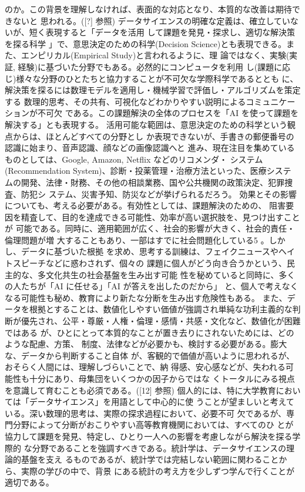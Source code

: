 \documentclass[
]{book}
\theoremstyle{definition}
\theoremstyle{definition}
\theoremstyle{definition}
\theoremstyle{definition}
\theoremstyle{remark}
\begin{document}
のか。この背景を理解しなければ、表面的な対応となり、本質的な改善は期待できないと 思われる。({[}?{]} 参照)
データサイエンスの明確な定義は、確立していないが、短く表現すると「データを活用 して課題を発見・探求し、適切な解決策を探る科学 」で、意思決定のための科学(Decision Science)とも表現できる。また、エンピリカル(Empirical Study)と言われるように、理 論ではなく、実験(実証, 経験)に基づいた分野でもある。必然的にコンピュータを利用 し(課題に応じ)様々な分野のひとたちと協力することが不可欠な学際科学であるととも に、解決策を探るには数理モデルを適用し・機械学習で評価し・アルゴリズムを策定する 数理的思考、その共有、可視化などわかりやすい説明によるコミュニケーションが不可欠 である。この課題解決の全体のプロセスを「AI を使って課題を解決する」とも表現する。 活用可能な範囲は、意思決定のための科学という観点からは、ほとんどすべての分野とし か表現できないが、手書きの郵便番号の認識に始まり、音声認識、顔などの画像認識へと 進み、現在注目を集めているものとしては、Google, Amazon, Netflix などのリコメンダ・ システム(Recommendation System)、診断・投薬管理・治療方法といった、医療システ ムの開発、法律・財務、その他の相談業務、国や公共機関の政策決定、犯罪捜査、防犯シ ステム、災害予知、防災などが挙げられるだろう。
効果とその影響についても、考える必要がある。有効性としては、課題解決のための、 阻害要因を精査して、目的を達成できる可能性、効率が高い選択肢を、見つけ出すことが 可能である。同時に、適用範囲が広く、社会的影響が大きく、社会的責任・倫理問題が増 大することもあり、一部はすでに社会問題化している5 。しかし、データに基づいた根拠 を求め、思考する訓練は、フェイクニュースやヘイトスピーチなどに惑わされず、個々の 課題に個人がどう向き合うかという、民主的な、多文化共生の社会基盤を生み出す可能 性を秘めていると同時に、多くの人たちが「AI に任せる」「AI が答えを出したのだから」 と、個人で考えなくなる可能性も秘め、教育により新たな分断を生み出す危険性もある。 また、データを根拠とすることは、数値化しやすい価値が強調され単純な功利主義的な判 断が優先され、公平・尊厳・人権・倫理・感情・共感・文化など、数値化が困難ではある が、ひとにとって本質的なことが置き去りにされないためには、どのような配慮、方策、 制度、法律などが必要かも、検討する必要がある。膨大な、データから判断すること自体 が、客観的で価値が高いように思われるが、おそらく人間には、理解しづらいことで、納 得感、安心感などが、失われる可能性も十分にあり、母集団をいくつかの因子からではな くトータルにみる視点を意識して育むことも必須である。({[}12{]} 参照)
個人的には、特に大学教育においては「データサイエンス」を用語として中心的に使 うことが望ましいと考えている。深い数理的思考は、実際の探求過程において、必要不可 欠であるが、専門分野によって分断がおこりやすい高等教育機関においては、すべてのひ とが協力して課題を発見、特定し、ひとり一人への影響を考慮しながら解決を探る学際的 な分野であることを強調すべきである。統計学は、データサイエンスの理論的基盤を支え るものであるが、統計学では完結しない範囲に関わることから、実際の学びの中で、背景 にある統計の考え方を少しずつ学んで行くことが適切である。
\end{document}
